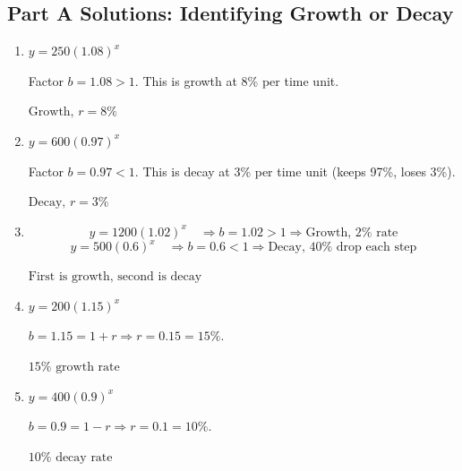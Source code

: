 \documentclass[14pt]{extarticle}
\begin{document}
\subsection*{Part A Solutions: Identifying Growth or Decay}
\begin{enumerate}
  \item \(y = 250(1.08)^x\)

  Factor \(b = 1.08 > 1\). This is growth at 8\% per time unit.

  \(\boxed{\text{Growth, } r = 8\%}\)

  \item \(y = 600(0.97)^x\)

  Factor \(b = 0.97 < 1\). This is decay at 3\% per time unit (keeps 97\%, loses 3\%).

  \(\boxed{\text{Decay, } r = 3\%}\)

  \item
  \[
  y = 1200(1.02)^x \quad \Rightarrow b = 1.02 > 1 \Rightarrow \text{Growth, } 2\% \text{ rate}
  \]
  \[
  y = 500(0.6)^x \quad \Rightarrow b = 0.6 < 1 \Rightarrow \text{Decay, } 40\% \text{ drop each step}
  \]

  \(\boxed{\text{First is growth, second is decay}}\)

  \item \(y = 200(1.15)^x\)

  \(b = 1.15 = 1 + r \Rightarrow r = 0.15 = 15\%.\)

  \(\boxed{15\% \text{ growth rate}}\)

  \item \(y = 400(0.9)^x\)

  \(b = 0.9 = 1 - r \Rightarrow r = 0.1 = 10\%.\)

  \(\boxed{10\% \text{ decay rate}}\)
\end{enumerate}
\end{document}
